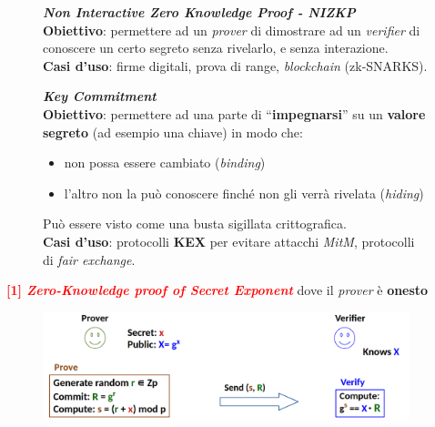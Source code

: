 \begin{flushleft}
    \begin{figure}[h]
        \centering
        \begin{minipage}[t]{0.45\textwidth}
            \textbf{\textit{Non Interactive Zero Knowledge Proof - NIZKP}} \\
            \textbf{Obiettivo}: permettere ad un \textit{prover} di dimostrare ad un \textit{verifier} di conoscere un certo segreto senza rivelarlo, e senza interazione. \\
            \textbf{Casi d'uso}: firme digitali, prova di range, \textit{blockchain} (zk-SNARKS).
        \end{minipage}
        \hfill
        \begin{minipage}[t]{0.45\textwidth}
            \textbf{\textit{Key Commitment}} \\
            \textbf{Obiettivo}: permettere ad una parte di ``\textbf{impegnarsi}'' su un \textbf{valore segreto} (ad esempio una chiave) in modo che:
            \begin{itemize}[nosep]
                \item non possa essere cambiato (\textit{binding})
                \item l'altro non la può conoscere finché non gli verrà rivelata (\textit{hiding})
            \end{itemize}
            Può essere visto come una busta sigillata crittografica. \\
            \textbf{Casi d'uso}: protocolli \textbf{KEX} per evitare attacchi \textit{MitM}, protocolli di \textit{fair exchange}.
        \end{minipage}
    \end{figure}

    \smallskip

    \textcolor{red}{\textbf{[1] \textit{Zero-Knowledge proof of Secret Exponent}}} dove il \textit{prover} è \textbf{onesto} \\
    
    \begin{figure}[h]
        \centering
        \includegraphics[width=0.95\textwidth]{img/zk_honest_prover.png}
    \end{figure}


\end{flushleft}
